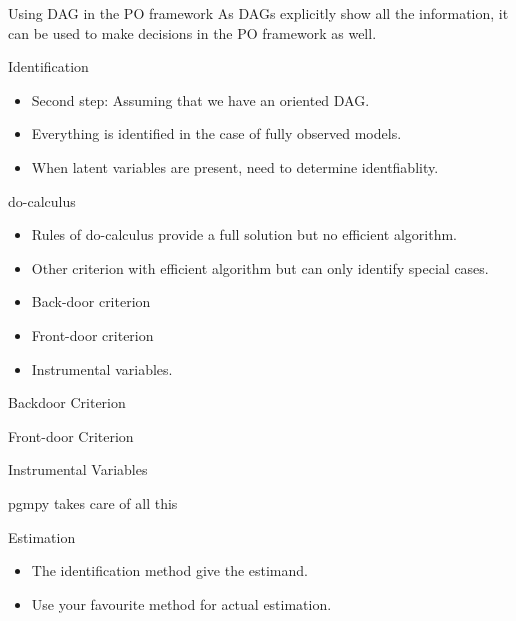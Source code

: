 \documentclass{beamer}
\begin{document}
\begin{frame}{Using DAG in the PO framework}
	As DAGs explicitly show all the information, it can be used to make
	decisions in the PO framework as well.
\end{frame}

\begin{frame}{Identification}
	\begin{itemize}
		\item Second step: Assuming that we have an oriented DAG.
		\item Everything is identified in the case of fully observed models.

		\item When latent variables are present, need to determine identfiablity.
	\end{itemize}
\end{frame}

\begin{frame}{do-calculus}
	\begin{itemize}
		\item Rules of do-calculus provide a full solution but no
			efficient algorithm.
		\item Other criterion with efficient algorithm but can only
			identify special cases.
		\item Back-door criterion
		\item Front-door criterion
		\item Instrumental variables.
	\end{itemize}
\end{frame}

\begin{frame}{Backdoor Criterion}
\end{frame}

\begin{frame}{Front-door Criterion}
\end{frame}

\begin{frame}{Instrumental Variables}
\end{frame}

\begin{frame}{pgmpy takes care of all this}
\end{frame}

\begin{frame}{Estimation}
	\begin{itemize}
		\item The identification method give the estimand.
		\item Use your favourite method for actual estimation.
	\end{itemize}
\end{frame}
\end{document}
